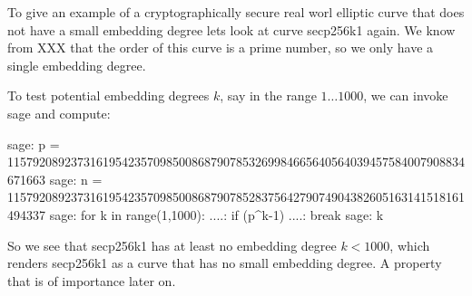 \begin{example} To give an example of a cryptographically secure real worl elliptic curve that does not have a small embedding degree lets look at curve secp256k1 again. We know from XXX that the order of this curve is a prime number, so we only have a single embedding degree.

To test potential embedding degrees $k$, say in the range $1\ldots 1000$, we can invoke sage and compute:
\begin{sagecommandline}
sage: p = 115792089237316195423570985008687907853269984665640564039457584007908834671663
sage: n = 115792089237316195423570985008687907852837564279074904382605163141518161494337
sage: for k in range(1,1000):
....:     if (p^k-1)%
....:         break
sage: k
\end{sagecommandline}
So we see that secp256k1 has at least no embedding degree $k<1000$, which renders secp256k1 as a curve that has no small embedding degree. A property that is of importance later on.
\end{example}
